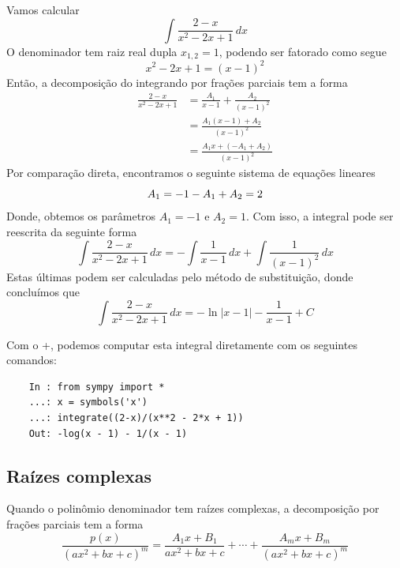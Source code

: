 \begin{ex}
  Vamos calcular
  \begin{equation}
    \int \frac{2-x}{x^2 - 2x + 1}\,dx
  \end{equation}
  O denominador tem raiz real dupla $x_{1,2} = 1$, podendo ser fatorado como segue
  \begin{equation}
    x^2 - 2x + 1 = (x-1)^2
  \end{equation}
  Então, a decomposição do integrando por frações parciais tem a forma
  \begin{align}
    \frac{2-x}{x^2 - 2x + 1} &= \frac{A_1}{x-1} + \frac{A_2}{(x-1)^2}\\
                             &= \frac{A_1(x-1) + A_2}{(x-1)^2}\\
                             &= \frac{A_1x + (-A_1 + A_2)}{(x-1)^2}
  \end{align}
  Por comparação direta, encontramos o seguinte sistema de equações lineares
  \begin{equation}
    A_1 = -1\\
    -A_1 + A_2 = 2
  \end{equation}
  Donde, obtemos os parâmetros $A_1 = -1$ e $A_2 = 1$. Com isso, a integral pode ser reescrita da seguinte forma
  \begin{equation}
    \int\frac{2-x}{x^2 - 2x + 1}\,dx = -\int\frac{1}{x-1}\,dx + \int\frac{1}{(x-1)^2}\,dx
  \end{equation}
  Estas últimas podem ser calculadas pelo método de substituição, donde concluímos que
  \begin{equation}
    \int\frac{2-x}{x^2 - 2x + 1}\,dx = -\ln|x-1| - \frac{1}{x-1} + C
  \end{equation}

  \ifispython
  Com o {\python}+{\sympy}, podemos computar esta integral diretamente com os seguintes comandos:
  \begin{lstlisting}
    In : from sympy import *
    ...: x = symbols('x')
    ...: integrate((2-x)/(x**2 - 2*x + 1))
    Out: -log(x - 1) - 1/(x - 1)
  \end{lstlisting}
  \fi  
\end{ex}

\subsection{Raízes complexas}

Quando o polinômio denominador tem raízes complexas, a decomposição por frações parciais tem a forma
\begin{equation}
  \frac{p(x)}{(ax^2 + bx + c)^m} = \frac{A_1x + B_1}{ax^2 + bx + c} + \cdots + \frac{A_mx + B_m}{(ax^2 + bx + c)^m}
\end{equation}

